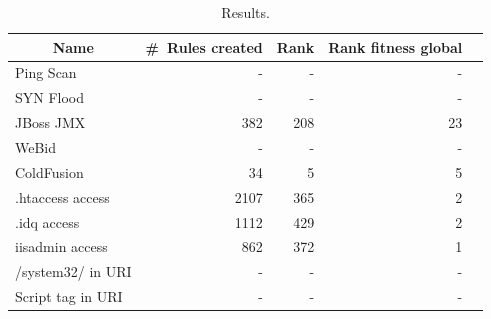 \documentclass[sigconf,review, anonymous]{acmart}
\begin{document}
\begin{table}[h!]
  \small
  \caption{\label{table:results}Results.}
  \centering
  \begin{tabular}{lrrrp{9cm}}
    \toprule
    \multicolumn{1}{c}{Name} &
    \multicolumn{1}{c}{\#~Rules created} &
    \multicolumn{1}{c}{Rank} &
    \multicolumn{1}{c}{Rank fitness global} \\
    \midrule
    Ping Scan & - & - & - \\
    SYN Flood & - & - & - \\
    JBoss JMX & 382 & 208 & 23 \\
    WeBid & - & - & - \\    
    ColdFusion & 34 & 5 & 5\\
    .htaccess access & 2107 & 365 & 2\\
    .idq access & 1112 & 429 & 2 \\
    iisadmin access & 862 & 372 & 1 \\
    /system32/ in URI & - & - & - \\
    Script tag in URI & - & - & - \\
    \bottomrule
  \end{tabular}
\end{table}

\end{document}
